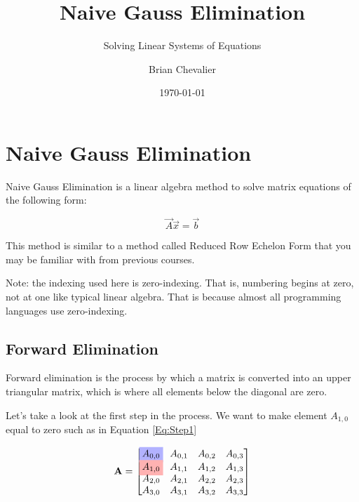 \documentclass{../../KDHnotes}
\title{Naive Gauss Elimination}
\subtitle{Solving Linear Systems of Equations}
\author{Brian Chevalier}
\date{\today}
\newcommand{\rhigh}[1]{%
  \ooalign{\hss\makebox[0pt]{\colorbox{red!30}{$#1$}}\hss\cr\phantom{$#1$}}%
}
\newcommand{\bhigh}[1]{%
  \ooalign{\hss\makebox[0pt]{\colorbox{blue!30}{$#1$}}\hss\cr\phantom{$#1$}}%
}
\begin{document}
 
\maketitle


\section{Naive Gauss Elimination}

Naive Gauss Elimination is a linear algebra method to solve matrix equations of the following form:

\begin{equation}
	\vec{A} \vec{x} = \vec{b}
\end{equation}

This method is similar to a method called Reduced Row Echelon Form that you may be familiar with from previous courses.


Note: the indexing used here is zero-indexing. That is, numbering begins at zero, not at one like typical linear algebra. That is because almost all programming languages use zero-indexing.

\subsection{Forward Elimination}
Forward elimination is the process by which a matrix is converted into an upper triangular matrix, which is where all elements below the diagonal are zero.

Let's take a look at the first step in the process. We want to make element $A_{1, 0}$ equal to zero such as in Equation \ref{Eq:Step1}

\begin{equation}
	\vec{A} = 
	\begin{bmatrix}
		\bhigh{A_{0,0}} & A_{0,1} & A_{0,2} & A_{0,3}\\
		\rhigh{A_{1,0}} & A_{1,1} & A_{1,2} & A_{1,3}\\
		A_{2,0} & A_{2,1} & A_{2,2} & A_{2,3}\\
		A_{3,0} & A_{3,1} & A_{3,2} & A_{3,3}\\
	\end{bmatrix}
	\label{Eq:Step1}
\end{equation}
\end{document}
